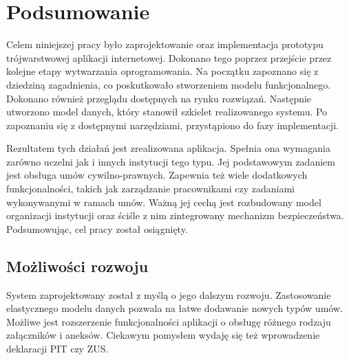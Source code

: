 \chapter{Podsumowanie}
Celem niniejszej pracy było zaprojektowanie oraz implementacja prototypu trójwarstwowej aplikacji internetowej. Dokonano tego poprzez przejście przez kolejne etapy wytwarzania oprogramowania. Na początku zapoznano się z dziedziną zagadnienia, co poskutkowało stworzeniem modelu funkcjonalnego. Dokonano również przeglądu dostępnych na rynku rozwiązań. Następnie utworzono model danych, który stanowił szkielet realizowanego systemu. Po zapoznaniu się z dostępnymi narzędziami, przystąpiono do fazy implementacji. 

Rezultatem tych działań jest zrealizowana aplikacja. Spełnia ona wymagania zarówno uczelni jak i innych instytucji tego typu. Jej podstawowym zadaniem jest obsługa umów cywilno-prawnych. Zapewnia też wiele dodatkowych funkcjonalności, takich jak zarządzanie pracownikami czy zadaniami wykonywanymi w ramach umów. Ważną jej cechą jest rozbudowany model organizacji instytucji oraz ściśle z nim zintegrowany mechanizm bezpieczeństwa. Podsumowując, cel pracy został osiągnięty.

\section[Możliwości rozwoju][Możliwości rozwoju]{Możliwości rozwoju}
System zaprojektowany został z myślą o jego dalszym rozwoju. Zastosowanie elastycznego modelu danych pozwala na łatwe dodawanie nowych typów umów. Możliwe jest rozszerzenie funkcjonalności aplikacji o obsługę różnego rodzaju załączników i aneksów. Ciekawym pomysłem wydaję się też wprowadzenie deklaracji PIT czy ZUS. 




